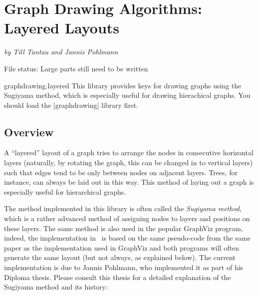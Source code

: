 %
%
%

\section{Graph Drawing Algorithms: Layered Layouts}

{\emph{by  Till Tantau and Jannis Pohlmann}}

File status: Large parts still need to be written

\begin{tikzlibrary}{graphdrawing.layered}
  This library provides keys for drawing graphs using the Sugiyama
  method, which is especially useful for drawing hierachical graphs.
  You should load the |graphdrawing| library first.
\end{tikzlibrary}



\subsection{Overview}

A ``layered'' layout of a graph tries to arrange the nodes in
consecutive horizontal layers (naturally, by rotating the graph, this
can be changed in to vertical layers) such that edges tend to be only
between nodes on adjacent layers. Trees, for instance, can always be
laid out in this way. This method of laying out a graph is especially
useful for hierarchical graphs.

The method implemented in this library is often called the
\emph{Sugiyama method}, which is a rather advanced method of
assigning nodes to layers and positions on these layers. The same
method is also used in the popular GraphViz program, indeed, the
implementation in \tikzname\ is based on the same pseudo-code from the
same paper as the implementation used in GraphViz and both programs
will often generate the same layout (but not always, as explained
below). The current implementation is due to Jannis Pohlmann, who
implemented it as part of his Diploma thesis. Please consult this
thesis for a detailed explanation of the Sugiyama method and its
history:

